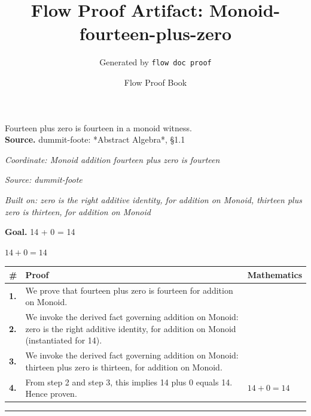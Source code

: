 \documentclass[11pt]{article}
\title{Flow Proof Artifact: Monoid-fourteen-plus-zero}
\author{Generated by \texttt{flow doc proof}}
\date{Flow Proof Book}
\theoremstyle{definition}
\begin{document}
\maketitle
Fourteen plus zero is fourteen in a monoid witness.\\[0.5em]
\textbf{Source.} dummit-foote: *Abstract Algebra*, §1.1\\[0.5em]
\bigskip
{}\par
\smallskip\noindent\textit{Coordinate: Monoid \cdot addition \cdot fourteen plus zero is fourteen}\par
\smallskip\noindent\textit{Source: dummit-foote}\par
\smallskip\noindent\textit{Built on: zero is the right additive identity, for addition on Monoid, thirteen plus zero is thirteen, for addition on Monoid}\par
\medskip
\noindent\textbf{Goal.} 14 + 0 = 14\par
\noindent$\displaystyle 14 + 0 = 14$\par
\medskip
\noindent
\begin{tabular}{@{} >{\raggedright\arraybackslash}p{} >{\raggedright\arraybackslash}p{} >{\raggedleft\arraybackslash}p{} @{}}
\textbf{\#} & \textbf{Proof} & \textbf{Mathematics} \\
\midrule
\textbf{1.} & We prove that fourteen plus zero is fourteen for addition on Monoid. & \\[0.45em]
\textbf{2.} & We invoke the derived fact governing addition on Monoid: zero is the right additive identity, for addition on Monoid (instantiated for 14). & \\[0.45em]
\textbf{3.} & We invoke the derived fact governing addition on Monoid: thirteen plus zero is thirteen, for addition on Monoid. & \\[0.45em]
\textbf{4.} & From step 2 and step 3, this implies 14 plus 0 equals 14. Hence proven. & $\displaystyle 14 + 0 = 14$ \\[0.45em]
\bottomrule
\end{tabular}
\label{thm:Monoid-addition-fourteen_plus_zero_is_fourteen}
\par\medskip\hrule
\end{document}
